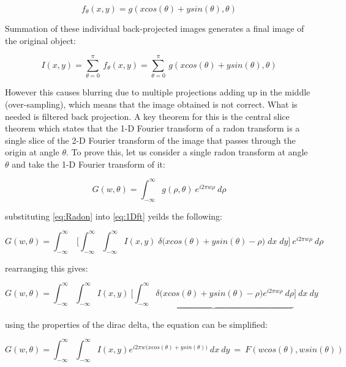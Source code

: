 \begin{equation}
f_{\theta}(x,y) = g(xcos(\theta) + ysin(\theta), \theta)
\end{equation}

\noindent
Summation of these individual back-projected images generates a final image of the original object:

\begin{equation}
I(x,y) = \sum_{\theta=0}^{\pi} \: f_{\theta}(x,y) = \sum_{\theta=0}^{\pi} \: g(xcos(\theta) + ysin(\theta), \theta)
\end{equation}

However this causes blurring due to multiple projections adding up in the middle (over-sampling), which means that the image obtained is not correct. What is needed is filtered back projection.  A key theorem for this is the central slice theorem which states that the 1-D Fourier transform of a radon transform is a single slice of the 2-D Fourier transform of the image that passes through the origin at angle $\theta$. To prove this, let us consider a single radon transform at angle $\theta$ and take the 1-D Fourier transform of it:

\begin{equation}
G(w,\theta) = \int_{-\infty}^{\infty} g(\rho,\theta) \: e^{i2\pi  w \rho} \: d\rho
\label{eq:1Dft}
\end{equation}

\noindent
substituting \ref{eq:Radon} into \ref{eq:1Dft} yeilds the following:

\begin{equation}
G(w,\theta) = \int_{-\infty}^{\infty} \: \biggl[  \int_{-\infty}^{\infty} \int_{-\infty}^{\infty} I(x,y) \; \delta \big(xcos(\theta) + ysin(\theta) - \rho \big) \; dx \; dy  \biggr] \: e^{i2\pi  w \rho} \: d\rho
\end{equation}

\noindent
rearranging this gives:

\begin{equation}
G(w,\theta) = \int_{-\infty}^{\infty} \int_{-\infty}^{\infty} I(x,y) \: \biggl[ \underbrace{ \int_{-\infty}^{\infty} \delta \big(xcos(\theta) + ysin(\theta) - \rho \big) e^{i2\pi w \rho} \: d\rho} \biggr] \: dx \: dy
\end{equation}

\noindent
using the properties of the dirac delta, the equation can be simplified:

\begin{equation}
G(w,\theta) = \int_{-\infty}^{\infty} \int_{-\infty}^{\infty} I(x,y)   e^{i2\pi w \big(xcos(\theta) + ysin(\theta) \big)} \: dx \: dy \: = \: F(wcos(\theta),wsin(\theta))
\label{eq:sliceThrm}
\end{equation}

